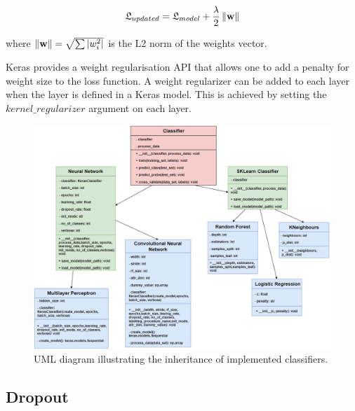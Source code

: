 \begin{equation} \label{weight_decay}
  \centering
  \mathfrak{L}_{updated} = \mathfrak{L}_{model} + \frac{\lambda}{2} \norm{\textbf{w}}
\end{equation} 

where $\left\lVert\textbf{w}\right\rVert = \sqrt{\sum |w_i^2|}$ is the L2 norm of the weights vector.\smallskip

Keras provides a weight regularisation API that allows one to add a penalty for weight size to the loss function. A weight regularizer can be added to each layer when the layer is defined in a Keras model. This is achieved by setting the $kernel\_regularizer$ argument on each layer.

\begin{figure}[H]
  \centering
  \centerline{\includegraphics[scale = 0.6]{Images/uml.png}}
  \caption{UML diagram illustrating the inheritance of implemented classifiers.}
  \label{uml_oop}
\end{figure}

\subsection{Dropout}

